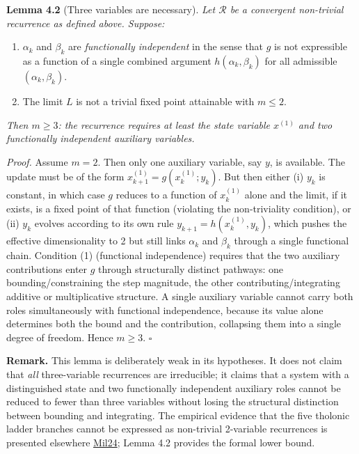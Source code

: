\documentclass[
  11pt,
  letterpaper,
]{article}
\providecommand{\tightlist}{%
  \setlength{\itemsep}{0pt}\setlength{\parskip}{0pt}}
\begin{document}
\textbf{Lemma 4.2} (Three variables are necessary). \emph{Let
\(\mathcal{R}\) be a convergent non-trivial recurrence as defined above.
Suppose:}

\begin{enumerate}
\def\labelenumi{\arabic{enumi}.}
\tightlist
\item
  \(\alpha_k\) and \(\beta_k\) are \emph{functionally independent} in
  the sense that \(g\) is not expressible as a function of a single
  combined argument \(h(\alpha_k, \beta_k)\) for all admissible
  \((\alpha_k, \beta_k)\).
\item
  The limit \(L\) is not a trivial fixed point attainable with
  \(m \le 2\).
\end{enumerate}

\emph{Then \(m \ge 3\): the recurrence requires at least the state
variable \(x^{(1)}\) and two functionally independent auxiliary
variables.}

\emph{Proof.} Assume \(m = 2\). Then only one auxiliary variable, say
\(y\), is available. The update must be of the form
\(x^{(1)}_{k+1} = g(x^{(1)}_k; y_k)\). But then either (i) \(y_k\) is
constant, in which case \(g\) reduces to a function of \(x^{(1)}_k\)
alone and the limit, if it exists, is a fixed point of that function
(violating the non-triviality condition), or (ii) \(y_k\) evolves
according to its own rule \(y_{k+1} = h(x^{(1)}_k, y_k)\), which pushes
the effective dimensionality to 2 but still links \(\alpha_k\) and
\(\beta_k\) through a single functional chain. Condition (1) (functional
independence) requires that the two auxiliary contributions enter \(g\)
through structurally distinct pathways: one bounding/constraining the
step magnitude, the other contributing/integrating additive or
multiplicative structure. A single auxiliary variable cannot carry both
roles simultaneously with functional independence, because its value
alone determines both the bound and the contribution, collapsing them
into a single degree of freedom. Hence \(m \ge 3\). \(\square\)

\textbf{Remark.} This lemma is deliberately weak in its hypotheses. It
does not claim that \emph{all} three-variable recurrences are
irreducible; it claims that a system with a distinguished state and two
functionally independent auxiliary roles cannot be reduced to fewer than
three variables without losing the structural distinction between
bounding and integrating. The empirical evidence that the five tholonic
ladder branches cannot be expressed as non-trivial 2-variable
recurrences is presented elsewhere
\href{https://tholonia.github.io/the-book/}{Mil24}; Lemma 4.2 provides
the formal lower bound.
\end{document}
